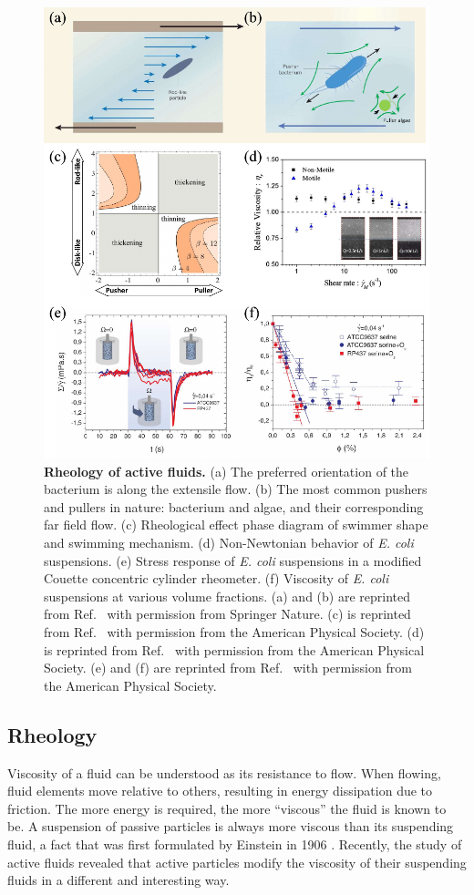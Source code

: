 \begin{figure}[!htbp]
	\begin{center}
	\includegraphics[height=4.5 in]{Figs/1-Intro/2.pdf}
	\end{center}
	\caption[Rheology of Active Fluids]
	{
	\textbf{Rheology of active fluids.}
	(a) The preferred orientation of the bacterium is along the extensile flow.
	(b) The most common pushers and pullers in nature: bacterium and algae, and their corresponding far field flow.
	(c) Rheological effect phase diagram of swimmer shape and swimming mechanism.
	(d) Non-Newtonian behavior of \textit{E. coli} suspensions.
	(e) Stress response of \textit{E. coli} suspensions in a modified Couette concentric cylinder rheometer.
	(f) Viscosity of \textit{E. coli} suspensions at various volume fractions.
	(a) and (b) are reprinted from Ref.~\cite{Marchetti2015} with permission from Springer Nature.
	(c) is reprinted from Ref.~\cite{Giomi2010} with permission from the American Physical Society.
	(d) is reprinted from Ref.~\cite{Gachelin2013} with permission from the American Physical Society.
	(e) and (f) are reprinted from Ref.~\cite{Lopez2015} with permission from the American Physical Society.
	}
	\label{fig:rheology-of-active-fluids}
\end{figure}

\subsection{Rheology}
\label{sec:rheology}
Viscosity of a fluid can be understood as its resistance to flow. When flowing, fluid elements move relative to others, resulting in energy dissipation due to friction. The more energy is required, the more ``viscous'' the fluid is known to be. A suspension
of passive particles is always more viscous than its suspending fluid, a fact that was first formulated by Einstein in 1906 \cite{Einstein1906}. Recently, the study of active fluids revealed that active particles modify the viscosity of their suspending fluids in a different and interesting way.

